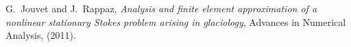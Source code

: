 \documentclass[letterpaper,final,12pt,reqno]{amsart}
\begin{document}
\begin{thebibliography}{4}
{\sc G.~Jouvet and J.~Rappaz}, {\em Analysis and finite element approximation
  of a nonlinear stationary {S}tokes problem arising in glaciology}, Advances
  in Numerical Analysis, (2011).


\end{thebibliography}
\end{document}
